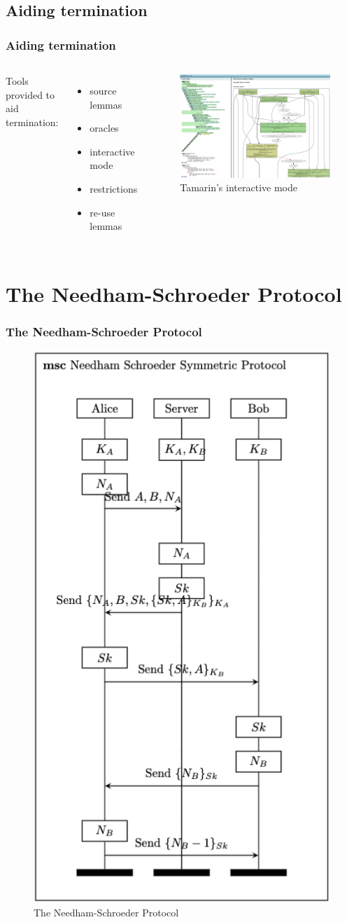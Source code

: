 \documentclass[aspectratio=169,t,xcolor=table]{beamer}
\begin{document}
\subsection{Aiding termination}
\begin{frame}
    \frametitle{Aiding termination}
    \begin{columns}
        Tools provided to aid termination:
        \begin{itemize}
            \item source lemmas
            \item oracles
            \item interactive mode
            \item restrictions
            \item re-use lemmas
        \end{itemize}
        \begin{figure}
            \centering
            \includegraphics[width=.9\textwidth]{images/gui.png}
            \caption{Tamarin's interactive mode}
        \end{figure}
    \end{columns}
\end{frame}

\section{The Needham-Schroeder Protocol}
\begin{frame}
    \frametitle{The Needham-Schroeder Protocol}
    \begin{figure}
        \centering
        \includegraphics[width=.26\textwidth]{images/NS.png}
        \caption{The Needham-Schroeder Protocol}
    \end{figure}
\end{frame}
\end{document}
